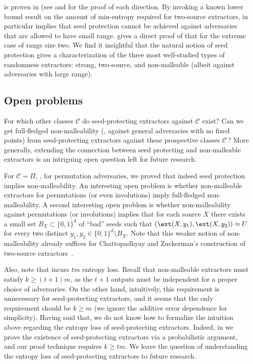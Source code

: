  is proven in  (see  and  for the proof of each direction. %
By invoking a known lower bound result on the amount of min-entropy required for two-source extractors,  in particular implies that seed protection cannot be achieved against adversaries that are allowed to have small range.  gives a direct proof of that for
%
%
the  %
extreme case of range size two. We find it insightful that the
%
natural notion of seed protection gives a characterization of the three most well-studied types of randomness extractors: strong, two-source, and non-malleable (albeit against adversaries with large range).



\subsection{Open problems}

For which other classes $\mathcal{C}$ do seed-protecting extractors against $\mathcal{C}$ exist?
Can we get full-fledged non-malleability (\ie,
against general adversaries with no fixed points) from seed-protecting extractors against these prospective %
%
classes $\mathcal C\,$?
More generally, extending the connection between seed protecting and non-malleable extractors is an intriguing open question left for future research.

%
%
%
%
%

For $\mathcal{C} = \Pi$, \ie, for permutation adversaries, we proved that indeed seed protection implies 
non-malleability. An interesting open problem is whether non-malleable extractors for permutations (or even involutions) imply full-fledged non-malleability.
A second interesting open problem is whether non-malleability against permutations (or involutions) implies that for each source $X$ there exists a small set $B_X \subset \{0,1\}^d$ of
``bad'' seeds such that $(\ext(X,y_1),\ext(X,y_2)) \approx U$ for every two distinct $y_1,y_2 \in \{0,1\}^d \setminus B_X$. Note that this 
weaker notion of non-malleability already suffices for Chattopadhyay and Zuckerman's construction of %
two-source  %
extractors~\cite{CZ19}.

Also, note that  incurs $tm$ entropy loss. Recall that non-malleable extractors must satisfy $k \ge (t+1)m$, as the $t+1$ outputs must be independent for a proper choice of adversaries. On the other hand, intuitively, this requirement is unnecessary for seed-protecting extractors, and it seems that the only requirement should be $k \ge m$ (we ignore the additive error dependence for simplicity).  Having said that, we do not know how to formalize the intuition above regarding the entropy loss of seed-protecting extractors. Indeed, in  we prove the existence of seed-protecting extractors via a probabilistic argument, and our proof technique requires $k \ge tm$. We leave the question of understanding the entropy loss of seed-protecting extractors to future research.

